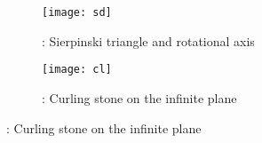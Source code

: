 \documentclass[12pt, a4paper]{article}
\newcommand{\rom}[1]{\uppercase\expandafter{\romannumeral #1\relax}}
\begin{document}
\begin{figure}
\vspace*{1cm}
\begin{subfigure}{.5\textwidth}
\centering
\texttt{[image: sd]} 
\vspace*{3mm}\caption*{\rom{6}: Sierpinski triangle and rotational axis}
\end{subfigure}%
\begin{subfigure}{.5\textwidth}
\centering
\texttt{[image: cl]}
\vspace*{3mm}\caption*{\rom{5}: Curling stone on the infinite plane}
\end{subfigure}\vspace*{-0.5cm}
\end{figure}


\end{document}
